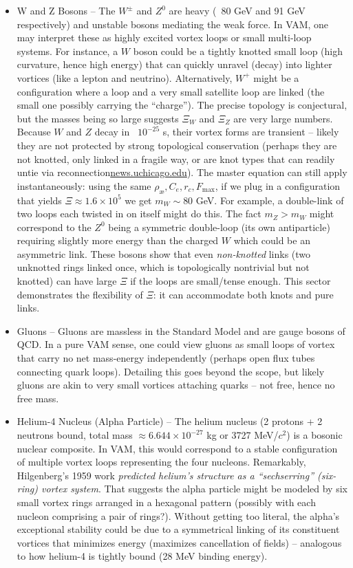 \begin{itemize}
\item
W and Z Bosons – The $W^\pm$ and $Z^0$ are heavy (~80 GeV and 91 GeV respectively) and unstable bosons mediating the weak force. In VAM, one may interpret these as highly excited vortex loops or small multi-loop systems. For instance, a $W$ boson could be a tightly knotted small loop (high curvature, hence high energy) that can quickly unravel (decay) into lighter vortices (like a lepton and neutrino). Alternatively, $W^+$ might be a configuration where a loop and a very small satellite loop are linked (the small one possibly carrying the “charge”). The precise topology is conjectural, but the masses being so large suggests $\Xi_{W}$ and $\Xi_{Z}$ are very large numbers. Because $W$ and $Z$ decay in ~$10^{-25}$ s, their vortex forms are transient – likely they are not protected by strong topological conservation (perhaps they are not knotted, only linked in a fragile way, or are knot types that can readily untie via reconnection\href{https://news.uchicago.edu/story/vortex-loops-could-untie-knotty-physics-problems#:~:text=Vortex%20knots%20should%2C%20in%20principle%2C,%E2%80%9D}{news.uchicago.edu}). The master equation can still apply instantaneously: using the same $\rho_{\text{\ae}},C_e,r_c,F_{\max}$, if we plug in a configuration that yields $\Xi\approx 1.6\times10^5$ we get $m_W \sim 80$ GeV. For example, a double-link of two loops each twisted in on itself might do this. The fact $m_Z > m_W$ might correspond to the $Z^0$ being a symmetric double-loop (its own antiparticle) requiring slightly more energy than the charged $W$ which could be an asymmetric link. These bosons show that even \textit{non-knotted} links (two unknotted rings linked once, which is topologically nontrivial but not knotted) can have large $\Xi$ if the loops are small/tense enough. This sector demonstrates the flexibility of $\Xi$: it can accommodate both knots and pure links.

\item
Gluons – Gluons are massless in the Standard Model and are gauge bosons of QCD. In a pure VAM sense, one could view gluons as small loops of vortex that carry no net mass-energy independently (perhaps open flux tubes connecting quark loops). Detailing this goes beyond the scope, but likely gluons are akin to very small vortices attaching quarks – not free, hence no free mass.

\item
Helium-4 Nucleus (Alpha Particle) – The helium nucleus (2 protons + 2 neutrons bound, total mass $\approx 6.644\times10^{-27}$ kg or 3727 MeV/$c^2$) is a bosonic nuclear composite. In VAM, this would correspond to a stable configuration of multiple vortex loops representing the four nucleons. Remarkably, Hilgenberg’s 1959 work \textit{predicted helium’s structure as a “sechserring” (six-ring) vortex system}. That suggests the alpha particle might be modeled by six small vortex rings arranged in a hexagonal pattern (possibly with each nucleon comprising a pair of rings?). Without getting too literal, the alpha’s exceptional stability could be due to a symmetrical linking of its constituent vortices that minimizes energy (maximizes cancellation of fields) – analogous to how helium-4 is tightly bound (28 MeV binding energy).


\end{itemize}
